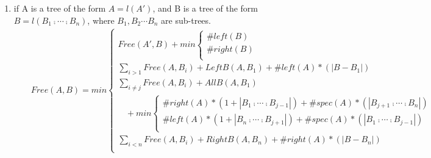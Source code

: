 \begin{theorem}
\begin{enumerate}
\begin{eqnarray*}
\begin{cases}
\begin{cases}
			\end{cases}\\
			\sum_{i < n}Free(A, B_i) + RightB(A, B_n) + \#right(A) * \left\vert B - B_n \right\vert \\
			\end{cases}\\
&&LeftA(A, B) = \#left(B)\\
&&LeftB(A, B) = \sum_{i > 1}Free(A, B_i) + LeftB(A, B_1) + \#left(A) * (\left\vert B - B_1 \right\vert)\\
&&RightA(A, B) = \#right(B)\\
&&RightB(A, B) = \sum_{i < n}Free(A, B_i) + RightB(A, B_n) + \#left(B) * (\left\vert B - B_n \right\vert)\\
&&AllA(A, B) = \#spec(B)\\
&&AllB(A, B) = min \sum_{i \neq j}Free(A, B_i) + AllB(A, B_j) + \#spec(A) * (\left\vert A - A_j \right\vert)\\
\end{eqnarray*}
\item if A is a tree of the form $A = l(A')$, and B is a tree of the form $B = l(B_1 \comp \cdots \comp B_n)$, where $B_1, B_2 \cdots B_n$ are sub-trees.
\begin{eqnarray*}
&&Free(A, B) = min \begin{cases}
			Free(A', B) + min \begin{cases}
			\#left(B) \\
			\#right(B) \\
			\end{cases}\\
			\sum_{i>1}Free(A, B_i) + LeftB(A, B_1) + \#left(A) *(\left\vert B - B_1 \right\vert)\\
			\sum_{i \neq j}Free(A, B_i) + AllB(A, B_1) \\
			\ \ \ \ + min \begin{cases}
			\#right(A) * (1 + \left\vert B_1 \comp \cdots \comp B_{j-1} \right\vert) + \#spec(A) * (\left\vert B_{j+1} \comp \cdots \comp B_n \right\vert)\\
			\#left(A) * (1 + \left\vert B_n \comp \cdots \comp B_{j+1} \right\vert) + \#spec(A) * (\left\vert B_1 \comp \cdots \comp B_{j-1} \right\vert)\\
			\end{cases}\\
			\sum_{i<n}Free(A, B_i) + RightB(A, B_n) + \#right(A) * (\left\vert B - B_n \right\vert)\\  
			\end{cases}\\

\end{eqnarray*}
\end{enumerate}
\end{theorem}
